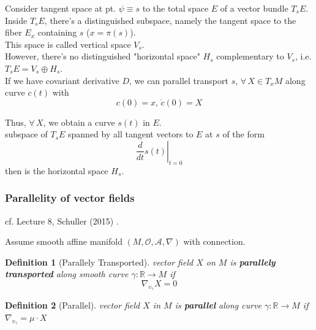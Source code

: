 \documentclass[10pt]{amsart}
\newtheorem{definition}{Definition}
\begin{document}
\begin{multicols*}{2}
Consider tangent space at pt. $\psi \equiv s$ to the total space $E$ of a vector bundle $T_sE$. \\
Inside $T_sE$, there's a distinguished subspace, namely the tangent space to the fiber $E_x$ containing $s$ ($x=\pi(s)$). \\
This space is called vertical space $V_s$. \\

However, there's no distinguished "horizontal space" $H_s$ complementary to $V_s$, i.e. $T_sE = V_s \oplus H_s$. \\
If we have covariant derivative $D$, we can parallel transport $s$, $\forall\, X \in T_xM$ along curve $c(t)$ with 
\[
c(0) = x, \, \dot{c}(0) = X
\]

Thus, $\forall \, X$, we obtain a curve $s(t) $ in $E$. \\
subspace of $T_sE$ spanned by all tangent vectors to $E$ at $s$ of the form
\[
\left. \frac{d}{dt} s(t) \right|_{t=0}
\]
then is the horizontal space $H_s$.

\subsubsection{Parallelity of vector fields}

cf. Lecture 8, Schuller (2015) \cite{Schul2015}.

Assume smooth affine manifold $(M, \mathcal{O}, \mathcal{A}, \nabla)$ with connection.

\begin{definition}[Parallely Transported]
	vector field $X$ on $M$ is \textbf{parallely transported} along smooth curve $\gamma:\mathbb{R} \to M$ if 
	\begin{equation}
		\nabla_{v_{\gamma}} X = 0
	\end{equation}
\end{definition}

\begin{definition}[Parallel]
	vector field $X$ in $M$ is \textbf{parallel} along curve $\gamma:\mathbb{R} \to M$ if $\nabla_{v_{\gamma}} = \mu \cdot X$
\end{definition}


\end{multicols*}
\end{document}
